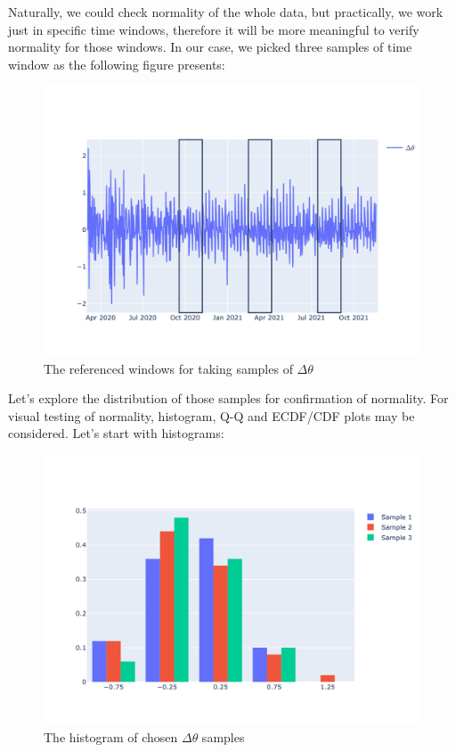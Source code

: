 \documentclass[
  digital, %
  table,   %
  twoside, %
  12pt,
  lof,     %
  lot,     %
]{fithesis3}
\begin{document}
Naturally, we could check normality of the 
whole data, but practically, we work just in 
specific time windows, therefore it will be 
more meaningful to verify normality for those 
windows. In our case, we picked three samples 
of time window as the following figure presents:

\begin{figure}[h]
  \begin{center}
    \includegraphics[width=\textwidth]{images/theta-sample-windows.png}
  \end{center}
  \caption{The referenced windows for taking samples of $\Delta \theta$}
  \label{fig:theta-sample-windows}
\end{figure}

Let's explore the distribution of those samples 
for confirmation of normality. 
For visual testing of normality, histogram, 
Q-Q and ECDF/CDF plots may be considered. 
Let's start with histograms:

\begin{figure}[h]
  \begin{center}
    \includegraphics[width=\textwidth]{images/theta-diff-histogram.png}
  \end{center}
  \caption{The histogram of chosen $\Delta \theta$ samples}
  \label{fig:theta-diff-histogram}
\end{figure}
\end{document}

